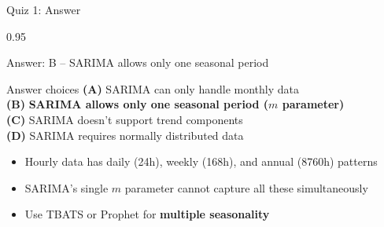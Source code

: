 \documentclass[9pt, aspectratio=169, t]{beamer}
\begin{document}
\begin{frame}{Quiz 1: Answer}
    \begin{cminipage}{0.95\textwidth}
    \begin{exampleblock}{Answer: B -- SARIMA allows only one seasonal period}

    \begin{block}{Answer choices}
        \textcolor{MainBlue}{\textbf{(A)}} SARIMA can only handle monthly data \incorrect\\[3pt]
        \textcolor{MainBlue}{\textbf{(B)}} \textbf{\textcolor{Forest}{SARIMA allows only one seasonal period ($m$ parameter)}} \correct\\[3pt]
        \textcolor{MainBlue}{\textbf{(C)}} SARIMA doesn't support trend components \incorrect\\[3pt]
        \textcolor{MainBlue}{\textbf{(D)}} SARIMA requires normally distributed data \incorrect
    \end{block}

        \vspace{0.3cm}

        \begin{itemize}
            \item Hourly data has daily (24h), weekly (168h), and annual (8760h) patterns
            \item SARIMA's single $m$ parameter cannot capture all these simultaneously
            \item Use TBATS or Prophet for \textbf{multiple seasonality}
        \end{itemize}
    \end{exampleblock}

    \end{cminipage}
\end{frame}
\end{document}
